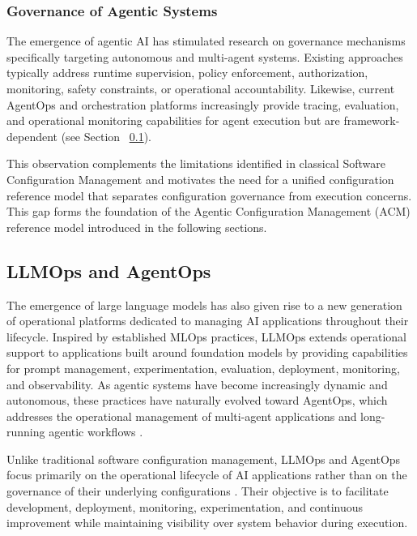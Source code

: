\documentclass[10pt]{article}
\begin{document}
\subsubsection{Governance of Agentic Systems}
\label{sec:agentic_governance}

The emergence of agentic AI has stimulated research on governance mechanisms specifically targeting autonomous and multi-agent systems. Existing approaches typically address runtime supervision, policy enforcement, authorization, monitoring, safety constraints, or operational accountability. Likewise, current AgentOps and orchestration platforms increasingly provide tracing, evaluation, and operational monitoring capabilities for agent execution but are framework-dependent (see Section ~\ref{sec:llmops_agentops}).

This observation complements the limitations identified in classical Software Configuration Management and motivates the need for a unified configuration reference model that separates configuration governance from execution concerns. This gap forms the foundation of the Agentic Configuration Management (ACM) reference model introduced in the following sections.

\subsection{LLMOps and AgentOps}
\label{sec:llmops_agentops}

The emergence of large language models has also given rise to a new generation of operational platforms dedicated to managing AI applications throughout their lifecycle. Inspired by established MLOps practices, LLMOps extends operational support to applications built around foundation models by providing capabilities for prompt management, experimentation, evaluation, deployment, monitoring, and observability. As agentic systems have become increasingly dynamic and autonomous, these practices have naturally evolved toward AgentOps, which addresses the operational management of multi-agent applications and long-running agentic workflows \cite{cesarano2026grand, shavit2023practices, pandey2025agentic, dumas2026}.

Unlike traditional software configuration management, LLMOps and AgentOps focus primarily on the operational lifecycle of AI applications rather than on the governance of their underlying configurations \cite{pahune2025transitioning, amershi2019, dong2024agentops}. Their objective is to facilitate development, deployment, monitoring, experimentation, and continuous improvement while maintaining visibility over system behavior during execution.
\end{document}
